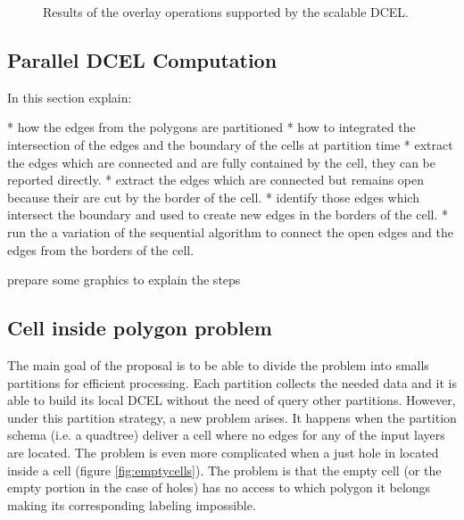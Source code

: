 \begin{figure}[!ht]
    \centering
    
    \caption{Results of the overlay operations supported by the scalable DCEL.}\label{fig:overlay_operations}
\end{figure}

\subsection{Parallel DCEL Computation}
In this section explain:

* how the edges from the polygons are partitioned
* how to integrated the intersection of the edges and the boundary of the cells at partition time
* extract the edges which are connected and are fully contained by the cell, they can be reported directly.
* extract the edges which are connected but remains open because their are cut by the border of the cell.
* identify those edges which intersect the boundary and used to create new edges in the borders of the cell.  
* run the a variation of the sequential algorithm to connect the open edges and the edges from the borders of the cell.

prepare some graphics to explain the steps


\subsection{Cell inside polygon problem} \label{sec:anomalies}
The main goal of the proposal is to be able to divide the problem into smalls partitions for efficient processing.  Each partition collects the needed data and it is able to build its local DCEL without the need of query other partitions.  However, under this partition strategy, a new problem arises.  It happens when the partition schema (i.e. a quadtree) deliver a cell where no edges for any of the input layers are located.  The problem is even more complicated when a just hole in located inside a cell (figure \ref{fig:emptycells}).  The problem is that the empty cell (or the empty portion in the case of holes) has no access to which polygon it belongs making its corresponding labeling impossible.  

